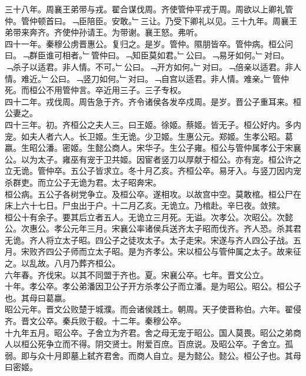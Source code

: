 \documentclass{zhvt-classic}
\begin{document}
\hspace*{2em}三十八年。周襄王弟带与戎。翟合谋伐周。齐使管仲平戎于周。周欲以上卿礼管仲。管仲顿首曰。﹁臣陪臣。安敢。﹂三让。乃受下卿礼以见。三十九年。周襄王弟带来奔齐。齐使仲孙请王。为带谢。襄王怒。弗听。\\
\hspace*{2em}四十一年。秦穆公虏晋惠公。复归之。是岁。管仲。隰朋皆卒。管仲病。桓公问曰。﹁群臣谁可相者。﹂管仲曰。﹁知臣莫如君。﹂公曰。﹁易牙如何。﹂对曰。﹁杀子以适君。非人情。不可。﹂公曰。﹁开方如何。﹂对曰。﹁倍亲以适君。非人情。难近。﹂公曰。﹁竖刀如何。﹂对曰。﹁自宫以适君。非人情。难亲。﹂管仲死。而桓公不用管仲言。卒近用三子。三子专权。\\
\hspace*{2em}四十二年。戎伐周。周告急于齐。齐令诸侯各发卒戍周。是岁。晋公子重耳来。桓公妻之。\\
\hspace*{2em}四十三年。初。齐桓公之夫人三。曰王姬。徐姬。蔡姬。皆无子。桓公好内。多内宠。如夫人者六人。长卫姬。生无诡。少卫姬。生惠公元。郑姬。生孝公昭。葛嬴。生昭公潘。密姬。生懿公商人。宋华子。生公子雍。桓公与管仲属孝公于宋襄公。以为太子。雍巫有宠于卫共姬。因宦者竖刀以厚献于桓公。亦有宠。桓公许之立无诡。管仲卒。五公子皆求立。冬十月乙亥。齐桓公卒。易牙入。与竖刀因内宠杀群吏。而立公子无诡为君。太子昭奔宋。\\
\hspace*{2em}桓公病。五公子各树党争立。及桓公卒。遂相攻。以故宫中空。莫敢棺。桓公尸在床上六十七日。尸虫出于户。十二月乙亥。无诡立。乃棺赴。辛巳夜。敛殡。\\
\hspace*{2em}桓公十有余子。要其后立者五人。无诡立三月死。无谥。次孝公。次昭公。次懿公。次惠公。孝公元年三月。宋襄公率诸侯兵送齐太子昭而伐齐。齐人恐。杀其君无诡。齐人将立太子昭。四公子之徒攻太子。太子走宋。宋遂与齐人四公子战。五月。宋败齐四公子师而立太子昭。是为齐孝公。宋以桓公与管仲属之太子。故来征之。以乱故。八月乃葬齐桓公。\\
\hspace*{2em}六年春。齐伐宋。以其不同盟于齐也。夏。宋襄公卒。七年。晋文公立。\\
\hspace*{2em}十年。孝公卒。孝公弟潘因卫公子开方杀孝公子而立潘。是为昭公。昭公。桓公子也。其母曰葛嬴。\\
\hspace*{2em}昭公元年。晋文公败楚于城濮。而会诸侯践土。朝周。天子使晋称伯。六年。翟侵齐。晋文公卒。秦兵败于殽。十二年。秦穆公卒。\\
\hspace*{2em}十九年五月。昭公卒。子舍立为齐君。舍之母无宠于昭公。国人莫畏。昭公之弟商人以桓公死争立而不得。阴交贤士。附爱百庶。百庶说。及昭公卒。子舍立。孤弱。即与众十月即墓上弑齐君舍。而商人自立。是为懿公。懿公。桓公子也。其母曰密姬。\\
\end{document}
